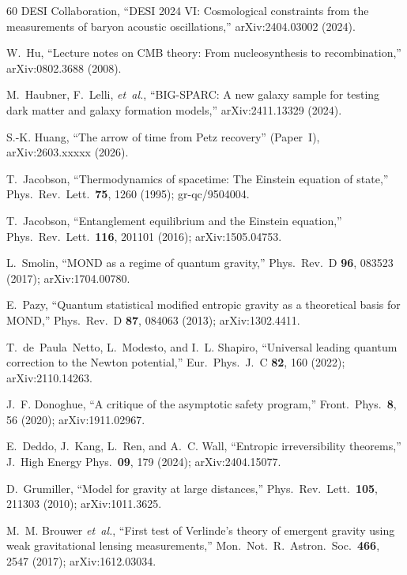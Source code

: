 \documentclass[prd,twocolumn,superscriptaddress,longbibliography,floatfix]{revtex4-2}
\begin{document}
\begin{thebibliography}{60}
DESI Collaboration,
``DESI 2024 VI: Cosmological constraints from the measurements
of baryon acoustic oscillations,''
arXiv:2404.03002 (2024).

W.~Hu,
``Lecture notes on CMB theory: From nucleosynthesis to
recombination,''
arXiv:0802.3688 (2008).

M.~Haubner, F.~Lelli, \emph{et~al.},
``BIG-SPARC: A new galaxy sample for testing dark matter and
galaxy formation models,''
arXiv:2411.13329 (2024).

S.-K. Huang,
``The arrow of time from Petz recovery'' (Paper~I),
arXiv:2603.xxxxx (2026).

T.~Jacobson,
``Thermodynamics of spacetime: The Einstein equation of state,''
Phys.\ Rev.\ Lett.\ \textbf{75}, 1260 (1995);
gr-qc/9504004.

T.~Jacobson,
``Entanglement equilibrium and the Einstein equation,''
Phys.\ Rev.\ Lett.\ \textbf{116}, 201101 (2016);
arXiv:1505.04753.

L.~Smolin,
``MOND as a regime of quantum gravity,''
Phys.\ Rev.\ D \textbf{96}, 083523 (2017);
arXiv:1704.00780.

E.~Pazy,
``Quantum statistical modified entropic gravity as a theoretical
basis for MOND,''
Phys.\ Rev.\ D \textbf{87}, 084063 (2013);
arXiv:1302.4411.

T.~de~Paula~Netto, L.~Modesto, and I.~L. Shapiro,
``Universal leading quantum correction to the Newton potential,''
Eur.\ Phys.\ J.\ C \textbf{82}, 160 (2022);
arXiv:2110.14263.

J.~F. Donoghue,
``A critique of the asymptotic safety program,''
Front.\ Phys.\ \textbf{8}, 56 (2020);
arXiv:1911.02967.

E.~Deddo, J.~Kang, L.~Ren, and A.~C. Wall,
``Entropic irreversibility theorems,''
J.\ High Energy Phys.\ \textbf{09}, 179 (2024);
arXiv:2404.15077.

D.~Grumiller,
``Model for gravity at large distances,''
Phys.\ Rev.\ Lett.\ \textbf{105}, 211303 (2010);
arXiv:1011.3625.

M.~M. Brouwer \emph{et~al.},
``First test of Verlinde's theory of emergent gravity using
weak gravitational lensing measurements,''
Mon.\ Not.\ R.\ Astron.\ Soc.\ \textbf{466}, 2547 (2017);
arXiv:1612.03034.


\end{thebibliography}
\end{document}
